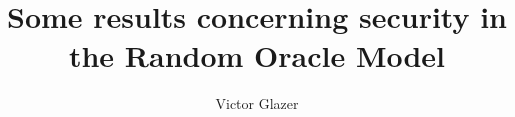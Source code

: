 \author{Victor Glazer}
\title{Some results concerning security in the Random Oracle Model}








%
\setcounter{tocdepth}{2}




